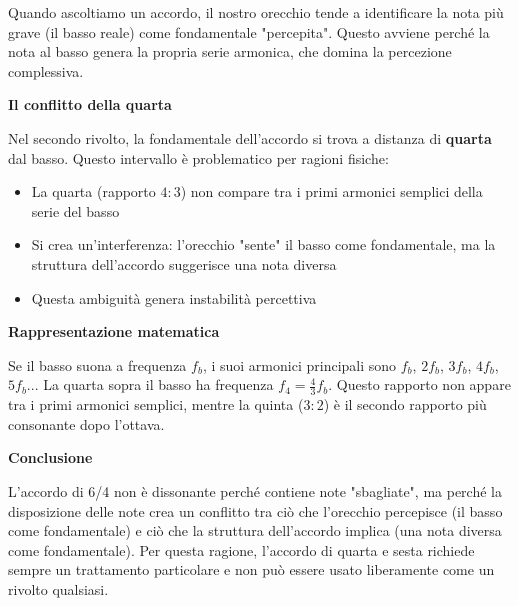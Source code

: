 \begin{fisica}
	\label{phys:conflitto_6_4}
	
	Quando ascoltiamo un accordo, il nostro orecchio tende a identificare la nota più grave (il basso reale) come fondamentale "percepita". Questo avviene perché la nota al basso genera la propria serie armonica, che domina la percezione complessiva.
	
	\textbf{Il conflitto della quarta}
	
	Nel secondo rivolto, la fondamentale dell'accordo si trova a distanza di \textbf{quarta} dal basso. Questo intervallo è problematico per ragioni fisiche:
	
	\begin{itemize}
		\item La quarta (rapporto $4:3$) non compare tra i primi armonici semplici della serie del basso
		\item Si crea un'interferenza: l'orecchio "sente" il basso come fondamentale, ma la struttura dell'accordo suggerisce una nota diversa
		\item Questa ambiguità genera instabilità percettiva
	\end{itemize}
	
	\textbf{Rappresentazione matematica}
	
	Se il basso suona a frequenza $f_b$, i suoi armonici principali sono $f_b$, $2f_b$, $3f_b$, $4f_b$, $5f_b$... La quarta sopra il basso ha frequenza $f_4 = \frac{4}{3}f_b$. Questo rapporto non appare tra i primi armonici semplici, mentre la quinta ($3:2$) è il secondo rapporto più consonante dopo l'ottava.
	
	\textbf{Conclusione}
	
	L'accordo di 6/4 non è dissonante perché contiene note "sbagliate", ma perché la disposizione delle note crea un conflitto tra ciò che l'orecchio percepisce (il basso come fondamentale) e ciò che la struttura dell'accordo implica (una nota diversa come fondamentale). Per questa ragione, l'accordo di quarta e sesta richiede sempre un trattamento particolare e non può essere usato liberamente come un rivolto qualsiasi.
\end{fisica}


